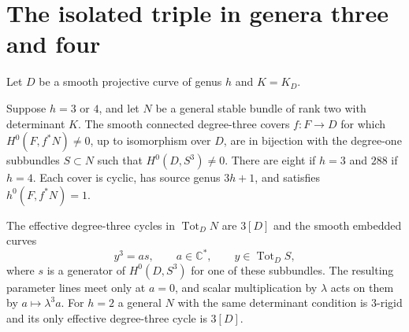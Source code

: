 \section{The isolated triple in genera three and four}\label{sec:covers}
Let $D$ be a smooth projective curve of genus $h$ and $K=K_D$.
\begin{theorem}\label{thm:classification}
Suppose $h=3$ or $4$, and let $N$ be a general stable bundle of
rank two with determinant $K$. The smooth connected degree-three
covers $f:F\to D$ for which $H^0(F,f^*N)\ne0$, up to isomorphism
over $D$, are in bijection with the degree-one subbundles
$S\subset N$ such that $H^0(D,S^3)\ne0$. There are eight if $h=3$
and $288$ if $h=4$. Each cover is cyclic, has source genus $3h+1$,
and satisfies $h^0(F,f^*N)=1$.

The effective degree-three cycles in $\operatorname{Tot}_D N$ are
$3[D]$ and the smooth embedded curves
\[
                   y^3=a s,\qquad a\in\mathbb C^*,
                   \qquad y\in\operatorname{Tot}_D S ,
\]
where $s$ is a generator of $H^0(D,S^3)$ for one of these subbundles.
The resulting parameter lines meet only at $a=0$, and scalar
multiplication by $\lambda$ acts on them by $a\mapsto\lambda^3a$.
For $h=2$ a general $N$ with the same determinant condition is
$3$-rigid and its only effective degree-three cycle is $3[D]$.
\end{theorem}


